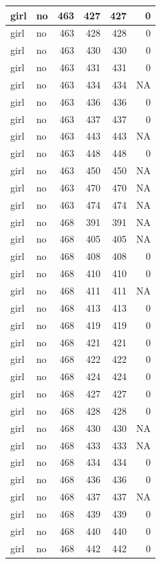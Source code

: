 \documentclass[man]{apa6}
\begin{document}
\begin{tabular}{l|l|r|r|r|r}
\hline
girl & no & 463 & 427 & 427 & 0\\
\hline
girl & no & 463 & 428 & 428 & 0\\
\hline
girl & no & 463 & 430 & 430 & 0\\
\hline
girl & no & 463 & 431 & 431 & 0\\
\hline
girl & no & 463 & 434 & 434 & NA\\
\hline
girl & no & 463 & 436 & 436 & 0\\
\hline
girl & no & 463 & 437 & 437 & 0\\
\hline
girl & no & 463 & 443 & 443 & NA\\
\hline
girl & no & 463 & 448 & 448 & 0\\
\hline
girl & no & 463 & 450 & 450 & NA\\
\hline
girl & no & 463 & 470 & 470 & NA\\
\hline
girl & no & 463 & 474 & 474 & NA\\
\hline
girl & no & 468 & 391 & 391 & NA\\
\hline
girl & no & 468 & 405 & 405 & NA\\
\hline
girl & no & 468 & 408 & 408 & 0\\
\hline
girl & no & 468 & 410 & 410 & 0\\
\hline
girl & no & 468 & 411 & 411 & NA\\
\hline
girl & no & 468 & 413 & 413 & 0\\
\hline
girl & no & 468 & 419 & 419 & 0\\
\hline
girl & no & 468 & 421 & 421 & 0\\
\hline
girl & no & 468 & 422 & 422 & 0\\
\hline
girl & no & 468 & 424 & 424 & 0\\
\hline
girl & no & 468 & 427 & 427 & 0\\
\hline
girl & no & 468 & 428 & 428 & 0\\
\hline
girl & no & 468 & 430 & 430 & NA\\
\hline
girl & no & 468 & 433 & 433 & NA\\
\hline
girl & no & 468 & 434 & 434 & 0\\
\hline
girl & no & 468 & 436 & 436 & 0\\
\hline
girl & no & 468 & 437 & 437 & NA\\
\hline
girl & no & 468 & 439 & 439 & 0\\
\hline
girl & no & 468 & 440 & 440 & 0\\
\hline
girl & no & 468 & 442 & 442 & 0\\

\end{tabular}
\end{document}
